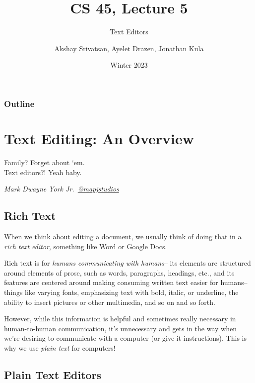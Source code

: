 \usepackage{shared/cs45}
\usepackage{epigraph}

\title{CS 45, Lecture 5}
\subtitle{Text Editors}
\date{Winter 2023}
\author{Akshay Srivatsan, Ayelet Drazen, Jonathan Kula}



\maketitle

\frame{\titlepage}

\begin{frame}
  \frametitle{Outline}
  \tableofcontents[hidesubsections]
\end{frame}

\section{Text Editing: An Overview}

\epigraph{Family? Forget about `em. \\ Text editors?! Yeah baby.}{\textit{Mark Dwayne York Jr.\ \href{https://www.youtube.com/@mapjstudios}{@mapjstudios}}}

\subsection{Rich Text}

When we think about editing a document, we usually think of doing that in 
a {\em rich text editor}, something like Word or Google Docs.

Rich text is for {\em humans communicating with humans}-- its elements
are structured around elements of prose, such as words, paragraphs,
headings, etc., and its features are centered around making consuming
written text easier for humans-- things like varying fonts, emphasizing
text with bold, italic, or underline, the ability to insert pictures
or other multimedia, and so on and so forth.

However, while this information is helpful and sometimes really necessary
in human-to-human communication, it's unnecessary and gets in the way when
we're desiring to communicate with a computer (or give it instructions).
This is why we use {\em plain text} for computers!

\subsection{Plain Text Editors}

